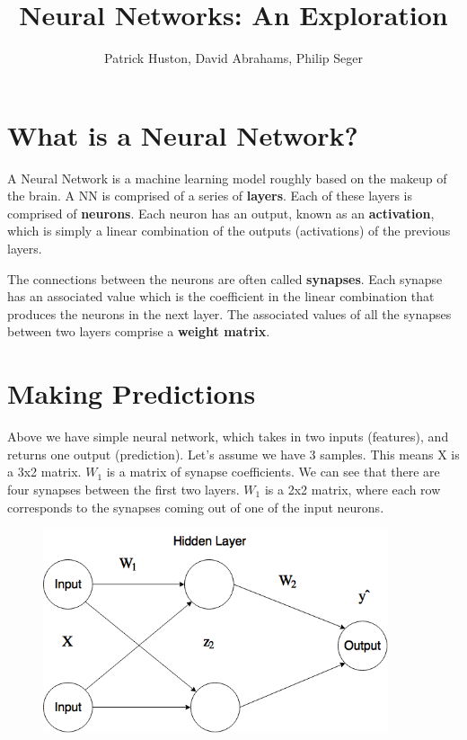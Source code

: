\documentclass[]{article}
\title{Neural Networks: An Exploration}
\author{Patrick Huston, David Abrahams, Philip Seger}
\begin{document}
\maketitle

\begin{abstract}

\end{abstract}

\section{What is a Neural Network?}

A Neural Network is a machine learning model roughly based on the makeup of the brain. A NN is comprised of a series of \textbf{layers}. Each of these layers is comprised of \textbf{neurons}. Each neuron has an output, known as an \textbf{activation}, which is simply a linear combination of the outputs (activations) of the previous layers.

The connections between the neurons are often called \textbf{synapses}. Each synapse has an associated value which is the coefficient in the linear combination that produces the neurons in the next layer. The associated values of all the synapses between two layers comprise a \textbf{weight matrix}.

\section{Making Predictions}

Above we have simple neural network, which takes in two inputs (features), and returns one output (prediction). Let's assume we have 3 samples. This means X is a 3x2 matrix. $W_1$ is a matrix of synapse coefficients. We can see that there are four synapses between the first two layers. $W_1$ is a 2x2 matrix, where each row corresponds to the synapses coming out of one of the input neurons.

\begin{figure}[H]
\includegraphics[width=4in]{neuralnet.png}
\centering
\end{figure}
\end{document}
